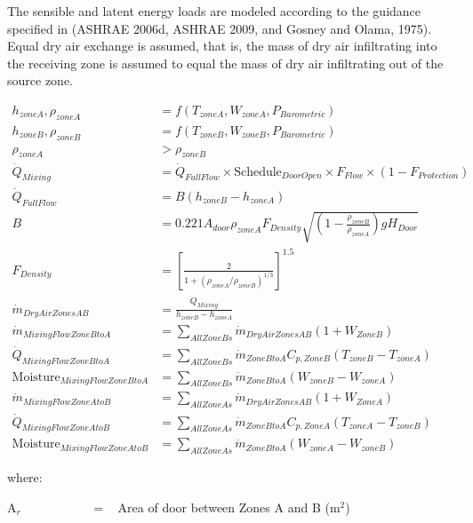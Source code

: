 The sensible and latent energy loads are modeled according to the guidance specified in (ASHRAE 2006d, ASHRAE 2009, and Gosney and Olama, 1975).~ Equal dry air exchange is assumed, that is, the mass of dry air infiltrating into the receiving zone is assumed to equal the mass of dry air infiltrating out of the source zone.

\begin{equation}
  \begin{array}{cl}
    h_{zoneA},\rho_{zoneA} & = f (T_{zoneA},W_{zoneA},P_{Barometric}) \\
    h_{zoneB},\rho_{zoneB} & = f (T_{zoneB},W_{zoneB},P_{Barometric}) \\
    \rho_{zoneA} & > \rho_{zoneB} \\
    \dot{Q}_{Mixing} & = \dot{Q}_{FullFlow} \times \text{Schedule}_{DoorOpen} \times F_{Flow} \times (1-F_{Protection}) \\
    \dot{Q}_{FullFlow} & = B (h_{zoneB}-h_{zoneA}) \\
    B & = 0.221 A_{door} \rho_{zoneA} F_{Density} \sqrt{ \left(1-\frac{\rho_{zoneB}}{\rho_{zoneA}}\right) g H_{Door} } \\
    F_{Density} & = \left[ \frac{2}{1+\left(\rho_{zoneA}/\rho_{zoneB}\right)^{1/3}} \right]^{1.5} \\
    \dot{m}_{DryAirZonesAB} & = \frac{\dot{Q}_{Mixing}}{h_{zoneB}-h_{zoneA}} \\
    \dot{m}_{MixingFlowZoneBtoA} & = \sum_{AllZoneBs} \dot{m}_{DryAirZonesAB}\left(1+W_{ZoneB}\right) \\
    \dot{Q}_{MixingFlowZoneBtoA} & = \sum_{AllZoneBs} \dot{m}_{ZoneBtoA} C_{p,ZoneB} \left(T_{zoneB}-T_{zoneA}\right) \\
    \text{Moisture}_{MixingFlowZoneBtoA} & = \sum_{AllZoneBs} \dot{m}_{ZoneBtoA} \left( W_{zoneB}-W_{zoneA} \right) \\
    \dot{m}_{MixingFlowZoneAtoB} & = \sum_{AllZoneAs} \dot{m}_{DryAirZonesAB}\left(1+W_{ZoneA}\right) \\
    \dot{Q}_{MixingFlowZoneAtoB} & = \sum_{AllZoneAs} \dot{m}_{ZoneBtoA} C_{p,ZoneA} \left(T_{zoneA}-T_{zoneB}\right) \\
    \text{Moisture}_{MixingFlowZoneAtoB} & = \sum_{AllZoneAs} \dot{m}_{ZoneBtoA} \left( W_{zoneA}-W_{zoneB} \right) 
  \end{array}
\end{equation}

where:

A\(_{r}\)~~~~~~~~~~~ = ~ Area of door between Zones A and B (m\(^{2}\))

